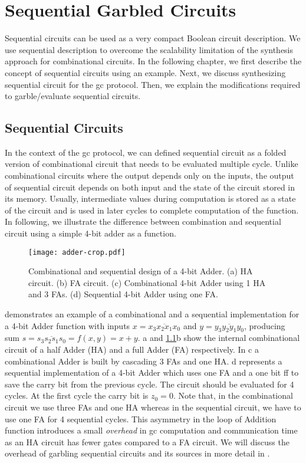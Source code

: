 \chapter{Sequential Garbled Circuits}\label{chap:seq}
Sequential circuits can be used as a very compact Boolean circuit description. We use sequential description to overcome the scalability limitation of the synthesis approach for combinational circuits.
In the following chapter, we first describe the concept of sequential circuits using an example.
Next, we discuss synthesizing sequential circuit for the \acrshort{gc} protocol.
Then, we explain the modifications required to garble/evaluate sequential circuits.

\section{Sequential Circuits}\label{sec:seq-seq}
In the context of the \acrshort{gc} protocol, we can defined sequential circuit as a folded version of combinational circuit that needs to be evaluated multiple cycle.
Unlike combinational circuits where the output depends only on the inputs, the output of sequential circuit depends on both input and the state of the circuit stored in its memory.
Usually, intermediate values during computation is stored as a state of the circuit and is used in later cycles to complete computation of the function.
In following, we illustrate the difference between combination and sequential circuit using a simple 4-bit adder as a function.

\begin{figure}[ht]
    \centering
    \texttt{[image: adder-crop.pdf]}
    \caption{Combinational and sequential design of a 4-bit Adder.
  (a) HA circuit.
  (b) FA circuit.
  (c) Combinational 4-bit Adder using 1 HA and 3 FAs.
  (d) Sequential 4-bit Adder using one FA.}\label{fig:combSeq}
\end{figure}

 demonstrates an example of a combinational and a sequential implementation for a 4-bit Adder function with inputs $x = \overline{x_3x_2x_1x_0}$ and $y = \overline{y_3y_2y_1y_0}$, producing sum $s = \overline{s_3s_2s_1s_0} = f(x, y) = x + y$.
a and \ref{fig:combSeq}b show the internal combinational circuit of a half Adder (HA) and a full Adder (FA) respectively.
In c a combinational Adder is built by cascading 3 FAs and one HA.
d represents a sequential implementation of a 4-bit Adder which uses one FA and a one bit \acrshort{ff} to save the carry bit from the previous cycle.
The circuit should be evaluated for 4 cycles.
At the first cycle the carry bit is $z_0=0$.
Note that, in the combinational circuit we use three FAs and one HA whereas in the sequential circuit, we have to use one FA for 4 sequential cycles.
This asymmetry in the loop of Addition function introduces a small \emph{overhead} in \acrshort{gc} computation and communication time as an HA circuit has fewer gates compared to a FA circuit.
We will discuss the overhead of garbling sequential circuits and its sources in more detail in .

